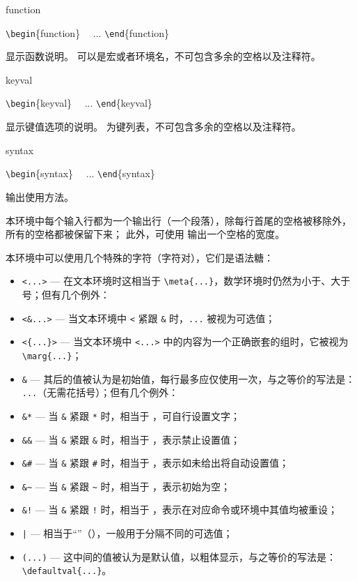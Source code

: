 \documentclass{cusdoc}
\begin{document}
\begin{function}[type=environment]{function}
\begin{syntax}
  \verb|\begin|\{function\}  
  ~~... 
  \verb|\end|\{function\}
\end{syntax}
显示函数说明。 可以是宏或者环境名，不可包含多余的空格以及注释符。
\end{function}

\begin{function}[type=environment]{keyval}
\begin{syntax}
  \verb|\begin|\{keyval\}  
  ~~... 
  \verb|\end|\{keyval\}
\end{syntax}
显示键值选项的说明。 为键列表，不可包含多余的空格以及注释符。
\end{function}

\begin{function}[type=environment]{syntax}
\begin{syntax}
  \verb|\begin|\{syntax\}
  ~~... 
  \verb|\end|\{syntax\}
\end{syntax}
输出使用方法。

本环境中每个输入行都为一个输出行（一个段落），除每行首尾的空格被移除外，所有的空格都被保留下来；
此外，可使用 \V{~} 输出一个空格的宽度。
\end{function}

本环境中可以使用几个特殊的字符（字符对），它们是语法糖：
\begin{itemize}[nosep]
  \item \verb|<...>| --- 在文本环境时这相当于 \verb|\meta{...}|，数学环境时仍然为小于、大于号；但有几个例外：
  \item \verb|<&...>| --- 当文本环境中 \verb|<| 紧跟 \verb|&| 时，\verb|...| 被视为可选值；
  \item \verb|<{...}>| --- 当文本环境中 \verb|<...>| 中的内容为一个正确嵌套的组时，它被视为 \verb|\marg{...}|；
  \item \verb|&| --- 其后的值被认为是初始值，每行最多应仅使用一次，与之等价的写法是： \verb| ...|（无需花括号）；但有几个例外：
  \item \verb|&*| --- 当 \verb|&| 紧跟 \verb|*| 时，相当于 ，可自行设置文字；
  \item \verb|&&| --- 当 \verb|&| 紧跟 \verb|&| 时，相当于 ，表示禁止设置值；
  \item \verb|&#| --- 当 \verb|&| 紧跟 \verb|#| 时，相当于 ，表示如未给出将自动设置值；
  \item \verb|&~| --- 当 \verb|&| 紧跟 \verb|~| 时，相当于 ，表示初始为空；
  \item \verb|&!| --- 当 \verb|&| 紧跟 \verb|!| 时，相当于 ，表示在对应命令或环境中其值均被重设；
  \item \verb+|+ --- 相当于“\orbar”（），一般用于分隔不同的可选值；
  \item \verb|(...)| --- 这中间的值被认为是默认值，以粗体显示，与之等价的写法是：\\ \verb|\defaultval{...}|。
\end{itemize}
\end{document}
